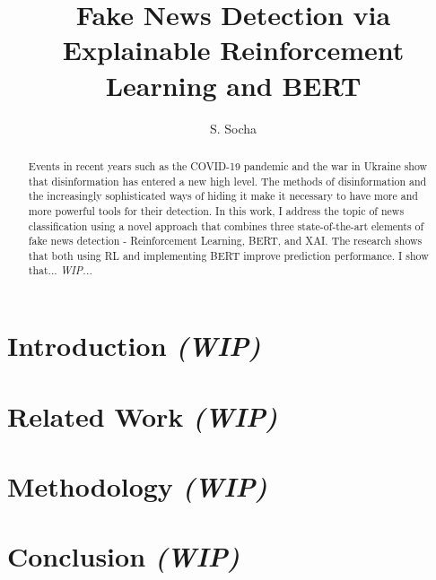 \documentclass[
  journal=largetwo,
  manuscript=article-type,
  year=2023,
  volume=1,
]{cup-journal}
\title{Fake News Detection via Explainable Reinforcement Learning and BERT}
\author{S. Socha}
\affiliation{Faculty of Economic Sciences, University of Warsaw, Warsaw, Poland}
\begin{document}
\begin{abstract}
Events in recent years such as the COVID-19 pandemic and the war in Ukraine show that disinformation has entered a new high level. The methods of disinformation and the increasingly sophisticated ways of hiding it make it necessary to have more and more powerful tools for their detection. In this work, I address the topic of news classification using a novel approach that combines three state-of-the-art elements of fake news detection - Reinforcement Learning, BERT, and XAI. The research shows that both using RL and implementing BERT improve prediction performance. I show that... \textit{WIP...}
\end{abstract}


\section{Introduction \textit{(WIP)}}


\section{Related Work \textit{(WIP)}}


\section{Methodology \textit{(WIP)}}


\section{Conclusion \textit{(WIP)}}




\printendnotes

\printbibliography
\end{document}

